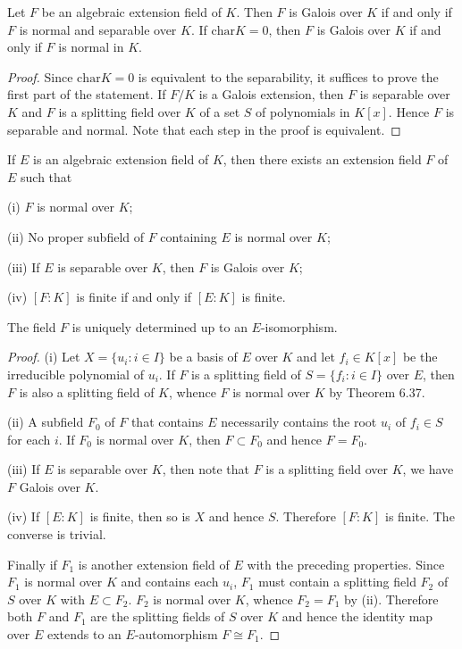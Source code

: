 \begin{corollary}
Let $F$ be an algebraic extension field of $K$. Then $F$ is Galois over $K$ if and only if $F$ is normal and separable over $K$. If $\mathrm{char}K=0$, then $F$ is Galois over $K$ if and only if $F$ is normal in $K$.
\end{corollary}
\begin{proof}
Since $\mathrm{char}K=0$ is equivalent to the separability, it suffices to prove the first part of the statement. If $F/K$ is a Galois extension, then $F$ is separable over $K$ and $F$ is a splitting field over $K$ of a set $S$ of polynomials in $K[x]$. Hence $F$ is separable and normal. Note that each step in the proof is equivalent.
\end{proof}
\begin{theorem}
If $E$ is an algebraic extension field of $K$, then there exists an extension field $F$ of $E$ such that \par
(i) $F$ is normal over $K$;\par
(ii) No proper subfield of $F$ containing $E$ is normal over $K$;\par
(iii) If $E$ is separable over $K$, then $F$ is Galois over $K$;\par
(iv) $[F:K]$ is finite if and only if $[E:K]$ is finite.\par
The field $F$ is uniquely determined up to an $E$-isomorphism.
\end{theorem}
\begin{proof}
(i) Let $X=\{u_i:i\in I\}$ be a basis of $E$ over $K$ and let $f_i\in K[x]$ be the irreducible polynomial of $u_i$. If $F$ is a splitting field of $S=\{f_i:i\in I\}$ over $E$, then $F$ is also a splitting field of $K$, whence $F$ is normal over $K$ by Theorem 6.37.\par
(ii) A subfield $F_0$ of $F$ that contains $E$ necessarily contains the root $u_i$ of $f_i\in S$ for each $i$. If $F_0$ is normal over $K$, then $F\subset F_0$ and hence $F=F_0$.\par
(iii) If $E$ is separable over $K$, then note that $F$ is a splitting field over $K$, we have $F$ Galois over $K$.\par
(iv) If $[E:K]$ is finite, then so is $X$ and hence $S$. Therefore $[F:K]$ is finite. The converse is trivial.\par
Finally if $F_1$ is another extension field of $E$ with the preceding properties. Since $F_1$ is normal over $K$ and contains each $u_i$, $F_1$ must contain a splitting field $F_2$ of $S$ over $K$ with $E\subset F_2$. $F_2$ is normal over $K$, whence $F_2=F_1$ by (ii). Therefore both $F$ and $F_1$ are the splitting fields of $S$ over $K$ and hence the identity map over $E$ extends to an $E$-automorphism $F\cong F_1$.
\end{proof}
